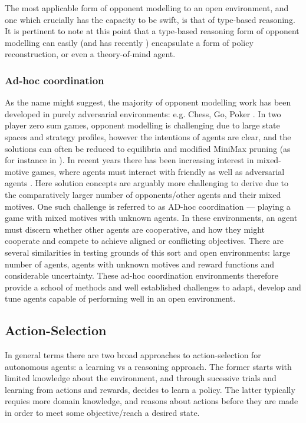 \newline \newline
The most applicable form of opponent modelling to an open environment, and one which crucially has the capacity to be swift, is that of type-based reasoning. It is pertinent to note at this point that a type-based reasoning form of opponent modelling can easily (and has recently \cite{Albrecht__explioting_causality}) encapsulate a form of policy reconstruction, or even a theory-of-mind agent.
\subsubsection{Ad-hoc coordination}
As the name might suggest, the majority of opponent modelling work has been developed in purely adversarial environments: e.g. Chess, Go, Poker \cite{Brown2017,Brown2020,AlphaGo}. In two player zero sum games, opponent modelling is challenging due to large state spaces and strategy profiles, however the intentions of agents are clear, and the solutions can often be reduced to equilibria and modified MiniMax pruning (as for instance in \cite{Brown2020}). 
\newline \newline
In recent years there has been increasing interest in mixed-motive games, where agents must interact with friendly as well as adversarial agents \cite{Barrett2017}. Here solution concepts are arguably more challenging to derive due to the comparatively larger number of opponents/other agents and their mixed motives. One such challenge is referred to as AD-hoc coordination --- playing a game with mixed motives with unknown agents. In these environments, an agent must discern whether other agents are cooperative, and how they might cooperate and compete to achieve aligned or conflicting objectives.
\newline \newline
There are several similarities in testing grounds of this sort and open environments: large number of agents, agents with unknown motives and reward functions and considerable uncertainty. These ad-hoc coordination environments therefore provide a school of methods and well established challenges to adapt, develop and tune agents capable of performing well in an open environment. 



\subsection{Action-Selection}
In general terms there are two broad approaches to action-selection for autonomous agents: a learning vs a reasoning approach. The former starts with limited knowledge about the environment, and through sucessive trials and learning from actions and rewards, decides to learn a policy. The latter typically requies more domain knowledge, and reasons about actions before they are made in order to meet some objective/reach a desired state. 

